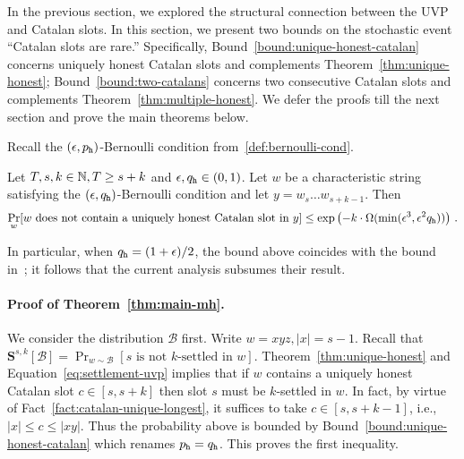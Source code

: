 
In the previous section, 
we explored the structural connection 
between the UVP and Catalan slots. 
In this section, we present two bounds 
on the stochastic event ``Catalan slots are rare.'' 
Specifically,
Bound~\ref{bound:unique-honest-catalan} 
concerns uniquely honest Catalan slots and complements Theorem~\ref{thm:unique-honest}; 
Bound~\ref{bound:two-catalans} concerns 
two consecutive Catalan slots and complements Theorem~\ref{thm:multiple-honest}. 
We defer the proofs till the next section 
and prove the main theorems below.



Recall the $(\epsilon, p_{\mathtt{h}})$-Bernoulli condition 
from~\ref{def:bernoulli-cond}.
\begin{bound}\label{bound:unique-honest-catalan}
  Let $T, s, k \in \mathbb{N}, T \geq s + k$ and  $\epsilon, q_{\mathtt{h}} \in (0, 1)$. 
  Let $w$ be a characteristic string satisfying 
  the $(\epsilon, q_{\mathtt{h}})$-Bernoulli condition 
  and let $y = w_s \ldots w_{s+k-1}$.
  Then 
  \[
    \Pr_w[\text{$w$ does not contain a uniquely honest Catalan slot in $y$}]  
      \leq 
      \exp\left(
        -k\cdot \Omega(\min(\epsilon^3, \epsilon^2 q_{\mathtt{h}})) 
      \right)
      \,.
  \]
\end{bound}
In particular, 
when $q_{\mathtt{h}} = (1+\epsilon)/2$, 
the bound above coincides with the 
bound in~\cite{LinearConsistency}; 
it follows that the current analysis 
subsumes their result.







\paragraph{Proof of Theorem~\ref{thm:main-mh}.}

  We consider the distribution $\mathcal{B}$ first. 
  Write $w = xyz, |x| = s - 1$.
  Recall that  
  $
    \mathbf{S}^{s,k}[\mathcal{B}] 
    = \Pr_{w \sim \mathcal{B}}[\text{$s$ is not $k$-settled in $w$}]
  $. 
  Theorem~\ref{thm:unique-honest} and Equation~\eqref{eq:settlement-uvp} implies that 
  if $w$ contains a uniquely honest Catalan slot $c \in [s, s + k]$ 
  then slot $s$ must be $k$-settled in $w$. 
  In fact, by virtue of Fact~\ref{fact:catalan-unique-longest}, 
  it suffices to take $c \in [s, s + k - 1]$, 
  i.e., $|x| \leq c \leq |xy|$. 
  Thus the probability above is bounded by 
  Bound~\ref{bound:unique-honest-catalan} 
  which renames $p_{\mathtt{h}} = q_{\mathtt{h}}$.
  This proves the first inequality. 
  

